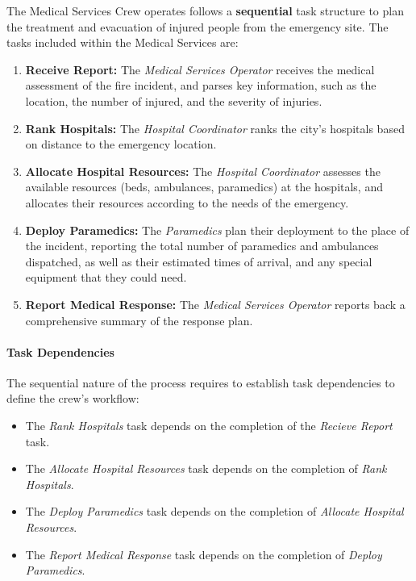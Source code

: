 The Medical Services Crew operates follows a \textbf{sequential} task structure to plan the treatment and evacuation of injured people from the emergency site. The tasks included within the Medical Services are:

\begin{enumerate}
	\item \textbf{Receive Report:} The \textit{Medical Services Operator} receives the medical assessment of the fire incident, and parses key information, such as the location, the number of injured, and the severity of injuries.
	
	\item \textbf{Rank Hospitals:} The \textit{Hospital Coordinator} ranks the city's hospitals based on distance to the emergency location.

	\item \textbf{Allocate Hospital Resources:} The \textit{Hospital Coordinator} assesses the available resources (beds, ambulances, paramedics) at the hospitals, and allocates their resources according to the needs of the emergency.
	
	\item \textbf{Deploy Paramedics:} The \textit{Paramedics} plan their deployment to the place of the incident, reporting the total number of paramedics and ambulances dispatched, as well as their estimated times of arrival, and any special equipment that they could need.
	
	\item \textbf{Report Medical Response:} The \textit{Medical Services Operator} reports back a comprehensive summary of the response plan.
\end{enumerate}

\paragraph{Task Dependencies}
The sequential nature of the process requires to establish task dependencies to define the crew's workflow:
\begin{itemize}
	\item The \textit{Rank Hospitals} task depends on the completion of the \textit{Recieve Report} task.
	\item The \textit{Allocate Hospital Resources} task depends on the completion of \textit{Rank Hospitals}.
	\item The \textit{Deploy Paramedics} task depends on the completion of \textit{Allocate Hospital Resources}.
	\item The \textit{Report Medical Response} task depends on the completion of \textit{Deploy Paramedics}.
\end{itemize}

